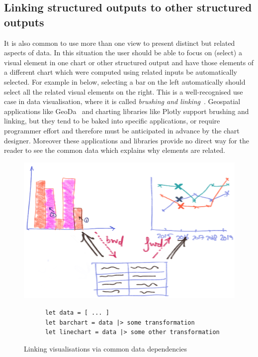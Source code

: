 \subsection{Linking structured outputs to other structured outputs}

It is also common to use more than one view to present distinct but related aspects of data. In this situation the user should be able to focus on (select) a visual element in one chart or other structured output and have those elements of a different chart which were computed using related inputs be automatically selected. For example in  below, selecting a bar on the left automatically should select all the related visual elements on the right. This is a well-recognised use case in data visualisation, where it is called \emph{brushing and linking}~\cite{becker87}. Geospatial applications like GeoDa~\cite{anselin06} and charting libraries like Plotly support brushing and linking, but they tend to be baked into specific applications, or require programmer effort and therefore must be anticipated in advance by the chart designer. Moreover these applications and libraries provide no direct way for the reader to see the common data which explains why elements are related.

\begin{figure}[H]
   {\includegraphics[scale=0.14]{fig/example/vis-linking.png}}
   \small
   \begin{lstlisting}
      let data = [ ... ]
      let barchart = data |> some transformation
      let linechart = data |> some other transformation
   \end{lstlisting}
   \caption{Linking visualisations via common data dependencies}
   \label{fig:introduction:vis-linking}
\end{figure}

